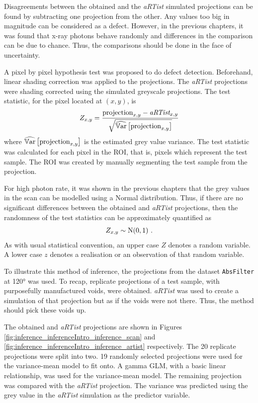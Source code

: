 Disagreements between the obtained and the \emph{aRTist} simulated projections can be found by subtracting one projection from the other. Any values too big in magnitude can be considered as a defect. However, in the previous chapters, it was found that x-ray photons behave randomly and differences in the comparison can be due to chance. Thus, the comparisons should be done in the face of uncertainty.

A pixel by pixel hypothesis test was proposed to do defect detection. Beforehand, linear shading correction was applied to the projections. The \emph{aRTist} projections were shading corrected using the simulated greyscale projections. The test statistic, for the pixel located at $(x,y)$, is
\begin{equation}
  Z_{x,y} = 
  \dfrac{
    \text{projection}_{x,y} - \emph{aRTist}_{x,y}
  }
  {
    \sqrt{\widehat{\operatorname{\mathbb{V}ar}}\left[\text{projection}_{x,y}\right]}
  }
\end{equation}
where $\widehat{\operatorname{\mathbb{V}ar}}\left[\text{projection}_{x,y}\right]$ is the estimated grey value variance. The test statistic was calculated for each pixel in the ROI, that is, pixels which represent the test sample. The ROI was created by manually segmenting the test sample from the projection.

For high photon rate, it was shown in the previous chapters that the grey values in the scan can be modelled using a Normal distribution. Thus, if there are no significant differences between the obtained and \emph{aRTist} projections, then the randomness of the test statistics can be approximately quantified as
\begin{equation}
Z_{x,y}\sim \operatorname{N}(0,1) \ .
\end{equation}
As with usual statistical convention, an upper case $Z$ denotes a random variable. A lower case $z$ denotes a realisation or an observation of that random variable.

To illustrate this method of inference, the projections from the dataset \texttt{AbsFilter} at \ang{120} was used. To recap, replicate projections of a test sample, with purposefully manufactured voids, were obtained. \emph{aRTist} was used to create a simulation of that projection but as if the voids were not there. Thus, the method should pick these voids up.

The obtained and \emph{aRTist} projections are shown in Figures \ref{fig:inference_inferenceIntro_inference_scan} and \ref{fig:inference_inferenceIntro_inference_artist} respectively. The 20 replicate projections were split into two. 19 randomly selected projections were used for the variance-mean model to fit onto. A gamma GLM, with a basic linear relationship, was used for the variance-mean model. The remaining projection was compared with the \emph{aRTist} projection. The variance was predicted using the grey value in the \emph{aRTist} simulation as the predictor variable.

